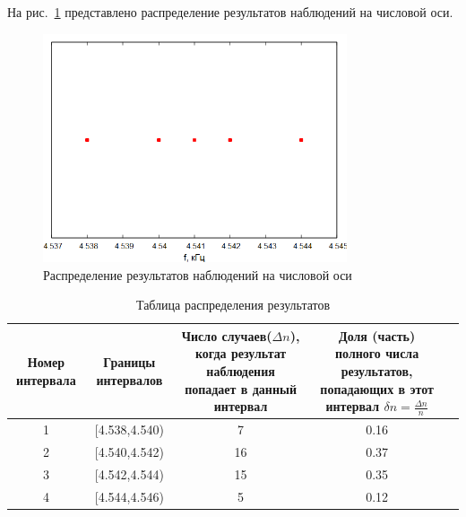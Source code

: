 На рис.~\ref{fig:graph2} представлено распределение результатов наблюдений на числовой оси.
\begin{figure}[H]
\centering
\includegraphics[width=0.8\textwidth]{graph2}
\caption{Распределение результатов наблюдений на числовой оси}
\label{fig:graph2}
\end{figure}
\begin{center}
\begin{table}[H]
\centering
\label{tabl:3}
\caption{Таблица распределения результатов}
\begin{tabular}{|c|c|c|c|c|}
\hline
\begin{minipage}{2cm}
    Номер интервала
\end{minipage}&
\begin{minipage}{3cm}
    Границы интервалов
\end{minipage} &
\begin{minipage}{5cm}
    Число случаев($\Delta n$), когда результат наблюдения попадает в данный интервал
\end{minipage} &
\begin{minipage}{5cm}
    Доля (часть) полного числа результатов, попадающих в этот интервал $\delta n=\frac{\Delta n}{n}$
\end{minipage}\\
\hline
1 &  [4.538,4.540)  &  7 & 0.16 \\
2 &  [4.540,4.542)  &  16 & 0.37 \\
3 &  [4.542,4.544)  &  15 & 0.35 \\
4 &  [4.544,4.546)  &  5 & 0.12 \\
\hline
\end{tabular}
\end{table}
\end{center}\\

